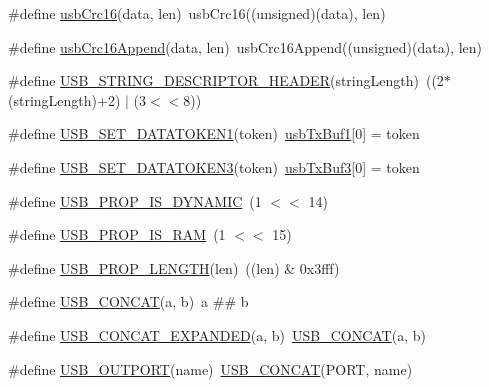 \begin{DoxyCompactItemize}
\item 
\#define \hyperlink{mhvlib-_vusb-_keyboard_2vusb_2usbdrv_8h_a7111154086ae6bb74946b6c157f3ee83}{usb\-Crc16}(data, len)~usb\-Crc16((unsigned)(data), len)
\item 
\#define \hyperlink{mhvlib-_vusb-_keyboard_2vusb_2usbdrv_8h_a96a513e4c0943ba6bd42aa1289874340}{usb\-Crc16\-Append}(data, len)~usb\-Crc16\-Append((unsigned)(data), len)
\item 
\#define \hyperlink{mhvlib-_vusb-_keyboard_2vusb_2usbdrv_8h_ad94ebd3045d80d1e2ab32c22be4ff96e}{U\-S\-B\-\_\-\-S\-T\-R\-I\-N\-G\-\_\-\-D\-E\-S\-C\-R\-I\-P\-T\-O\-R\-\_\-\-H\-E\-A\-D\-E\-R}(string\-Length)~((2$\ast$(string\-Length)+2) $|$ (3$<$$<$8))
\item 
\#define \hyperlink{mhvlib-_vusb-_keyboard_2vusb_2usbdrv_8h_aca823e3f6e7e9b50d59f00a1099fdcf5}{U\-S\-B\-\_\-\-S\-E\-T\-\_\-\-D\-A\-T\-A\-T\-O\-K\-E\-N1}(token)~\hyperlink{mhvlib-_vusb-_console_2vusb_2usbdrv_8h_a29d78d13efbbb79624fcdaf1d89d594f}{usb\-Tx\-Buf1}\mbox{[}0\mbox{]} = token
\item 
\#define \hyperlink{mhvlib-_vusb-_keyboard_2vusb_2usbdrv_8h_a88a3c0e0377c62f13d123a536a112adf}{U\-S\-B\-\_\-\-S\-E\-T\-\_\-\-D\-A\-T\-A\-T\-O\-K\-E\-N3}(token)~\hyperlink{mhvlib-_vusb-_console_2vusb_2usbdrv_8h_aeb55009b68188072efc4b84e54a881bd}{usb\-Tx\-Buf3}\mbox{[}0\mbox{]} = token
\item 
\#define \hyperlink{mhvlib-_vusb-_keyboard_2vusb_2usbdrv_8h_a25fffb901b71f003f9d90c411f998b36}{U\-S\-B\-\_\-\-P\-R\-O\-P\-\_\-\-I\-S\-\_\-\-D\-Y\-N\-A\-M\-I\-C}~(1 $<$$<$ 14)
\item 
\#define \hyperlink{mhvlib-_vusb-_keyboard_2vusb_2usbdrv_8h_a316a7fbfdf2ffb5155980cb14f93d53d}{U\-S\-B\-\_\-\-P\-R\-O\-P\-\_\-\-I\-S\-\_\-\-R\-A\-M}~(1 $<$$<$ 15)
\item 
\#define \hyperlink{mhvlib-_vusb-_keyboard_2vusb_2usbdrv_8h_a2e2eca50d63fd44256a2d701f579f700}{U\-S\-B\-\_\-\-P\-R\-O\-P\-\_\-\-L\-E\-N\-G\-T\-H}(len)~((len) \& 0x3fff)
\item 
\#define \hyperlink{mhvlib-_vusb-_keyboard_2vusb_2usbdrv_8h_a29b13b1979bf348e1abcaea5baf0e6a4}{U\-S\-B\-\_\-\-C\-O\-N\-C\-A\-T}(a, b)~a \#\# b
\item 
\#define \hyperlink{mhvlib-_vusb-_keyboard_2vusb_2usbdrv_8h_a1dbb59831873ddeb530740995641bf4d}{U\-S\-B\-\_\-\-C\-O\-N\-C\-A\-T\-\_\-\-E\-X\-P\-A\-N\-D\-E\-D}(a, b)~\hyperlink{mhvlib-_vusb-_console_2vusb_2usbdrv_8h_a29b13b1979bf348e1abcaea5baf0e6a4}{U\-S\-B\-\_\-\-C\-O\-N\-C\-A\-T}(a, b)
\item 
\#define \hyperlink{mhvlib-_vusb-_keyboard_2vusb_2usbdrv_8h_a11dc4b4a221259ea8a112cf8b7a8dd5f}{U\-S\-B\-\_\-\-O\-U\-T\-P\-O\-R\-T}(name)~\hyperlink{mhvlib-_vusb-_console_2vusb_2usbdrv_8h_a29b13b1979bf348e1abcaea5baf0e6a4}{U\-S\-B\-\_\-\-C\-O\-N\-C\-A\-T}(P\-O\-R\-T, name)
$$
\end{DoxyCompactItemize}
